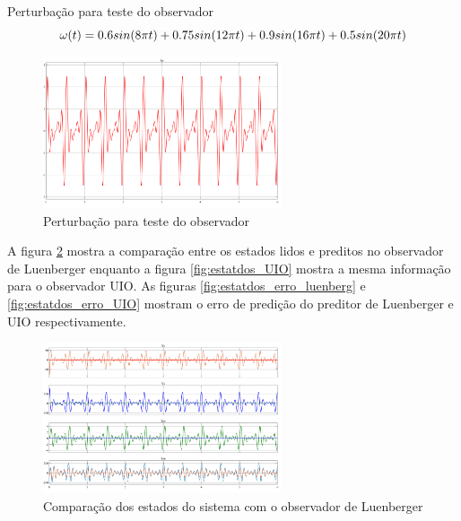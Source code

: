  Perturbação para teste do observador
\begin{equation}\label{eq:estatdos_perturbacao}  \footnotesize
    \omega(t)=0.6sin(8\pi t)+0.75sin(12\pi t)+0.9sin(16\pi t)+0.5sin(20\pi t)
\end{equation}

\begin{figure}[htbp]
    \begin{centering}
    \includegraphics[width=7cm]{img/estatdos_perturbacao.png} 
    \caption{Perturbação para teste do observador}
    \label{fig:estatdos_perturbacao}
    \end{centering}
\end{figure}

A figura \ref{fig:estatdos_luenberger} mostra a comparação entre os estados lidos e preditos no observador de Luenberger enquanto a figura \ref{fig:estatdos_UIO} mostra a mesma informação para o observador UIO. As figuras \ref{fig:estatdos_erro_luenberg} e \ref{fig:estatdos_erro_UIO} mostram o erro de predição do preditor de Luenberger e UIO respectivamente.

\FloatBarrier
\begin{figure}[htbp]
    \begin{centering}
    \includegraphics[width=7cm]{img/estatdos_luenberger.png} 
    \caption{Comparação dos estados do sistema com o observador de Luenberger}
    \label{fig:estatdos_luenberger}
    \end{centering}
\end{figure}

